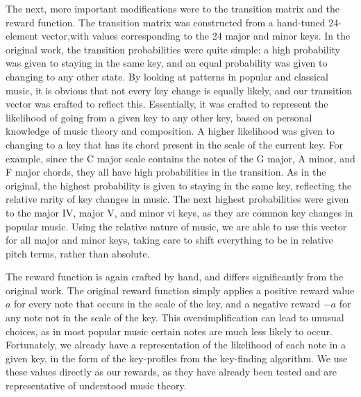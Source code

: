 \documentclass[11pt]{article} %
\begin{document}
The next, more important modifications were to the transition matrix and the reward function. The transition matrix was constructed from a hand-tuned 24-element vector,with values corresponding to the 24 major and minor keys. In the original work, the transition probabilities were quite simple: a high probability was given to staying in the same key, and an equal probability was given to changing to any other state. By looking at patterns in popular and classical music, it is obvious that not every key change is equally likely, and our transition vector was crafted to reflect this. Essentially, it was crafted to represent the likelihood of going from a given key to any other key, based on personal knowledge of music theory and composition. A higher likelihood was given to changing to a key that has its chord present in the scale of the current key. For example, since the C major scale contains the notes of the G major, A minor, and F major chords, they all have high probabilities in the transition. As in the original, the highest probability is given to staying in the same key, reflecting the relative rarity of key changes in music. The next highest probabilities were given to the major IV, major V, and minor vi keys, as they are common key changes in popular music. Using the relative nature of music, we are able to use this vector for all major and minor keys, taking care to shift everything to be in relative pitch terms, rather than absolute.

 The reward function is again crafted by hand, and differs significantly from the original work. The original reward function simply applies a positive reward value $a$ for every note that occurs in the scale of the key, and a negative reward $-a$ for any note not in the scale of the key. This oversimplification can lead to unusual choices, as in most popular music certain notes are much less likely to occur. Fortunately, we already have a representation of the likelihood of each note in a given key, in the form of the key-profiles from the key-finding algorithm. We use these values directly as our rewards, as they have already been tested and are representative of understood music theory.
\end{document}

